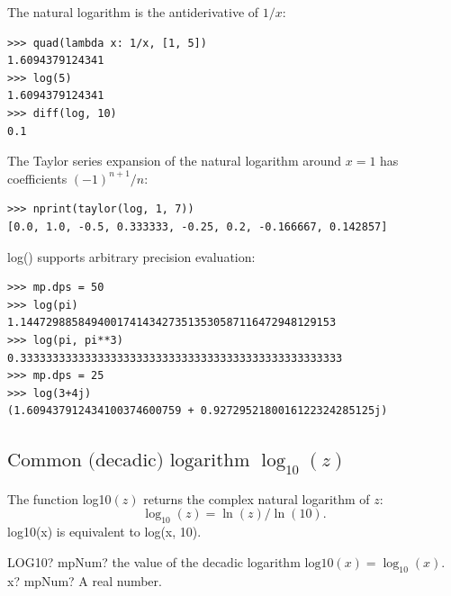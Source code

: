 The natural logarithm is the antiderivative of $1/x$:

\begin{lstlisting}
>>> quad(lambda x: 1/x, [1, 5])
1.6094379124341
>>> log(5)
1.6094379124341
>>> diff(log, 10)
0.1
\end{lstlisting}

The Taylor series expansion of the natural logarithm around $x=1$ has coefficients $(-1)^{n+1}/n$:

\begin{lstlisting}
>>> nprint(taylor(log, 1, 7))
[0.0, 1.0, -0.5, 0.333333, -0.25, 0.2, -0.166667, 0.142857]
\end{lstlisting}


log() supports arbitrary precision evaluation:

\begin{lstlisting}
>>> mp.dps = 50
>>> log(pi)
1.1447298858494001741434273513530587116472948129153
>>> log(pi, pi**3)
0.33333333333333333333333333333333333333333333333333
>>> mp.dps = 25
>>> log(3+4j)
(1.609437912434100374600759 + 0.9272952180016122324285125j)
\end{lstlisting}






\subsection{\texorpdfstring{$\text{Common (decadic) logarithm }\log_{10}(z)$}{log10}}

\vspace{0.3cm}
The function \textsf{log10$(z)$} returns the complex natural logarithm of $z$: 
\begin{equation}
	\log_{10}(z) =  \ln(z)/\ln(10).
\end{equation}
log10(x) is equivalent to log(x, 10).

\begin{mpFunctionsExtract}
	\mpWorksheetFunctionOneNotImplemented
	{LOG10? mpNum? the value of the decadic logarithm $\text{log10}(x) = \log_{10}(x)$.}
	{x? mpNum? A real number.}
\end{mpFunctionsExtract}

